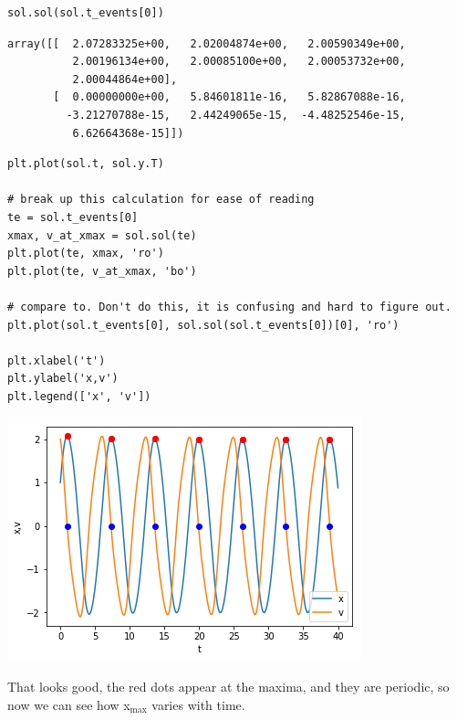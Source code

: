 \documentclass[11pt]{article}
\begin{document}
\begin{verbatim}
sol.sol(sol.t_events[0])
\end{verbatim}

\begin{verbatim}
array([[  2.07283325e+00,   2.02004874e+00,   2.00590349e+00,
          2.00196134e+00,   2.00085100e+00,   2.00053732e+00,
          2.00044864e+00],
       [  0.00000000e+00,   5.84601811e-16,   5.82867088e-16,
         -3.21270788e-15,   2.44249065e-15,  -4.48252546e-15,
          6.62664368e-15]])
\end{verbatim}


\begin{verbatim}
plt.plot(sol.t, sol.y.T)

# break up this calculation for ease of reading
te = sol.t_events[0]
xmax, v_at_xmax = sol.sol(te)
plt.plot(te, xmax, 'ro')
plt.plot(te, v_at_xmax, 'bo')

# compare to. Don't do this, it is confusing and hard to figure out.
plt.plot(sol.t_events[0], sol.sol(sol.t_events[0])[0], 'ro')

plt.xlabel('t')
plt.ylabel('x,v')
plt.legend(['x', 'v'])

\end{verbatim}

\begin{center}
\includegraphics[width=.9\linewidth]{obipy-resources/c515c00ecd6370edf5b32608ff70731e-388472EL.png}
\end{center}

That looks good, the red dots appear at the maxima, and they are periodic, so now we can see how x\(_{\text{max}}\) varies with time.
\end{document}
